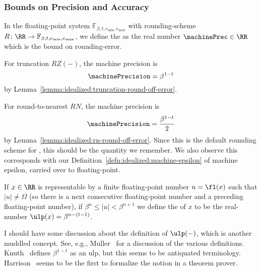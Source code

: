 \subsubsection{Bounds on Precision and Accuracy}

\begin{defn}
  In the floating-point system $\mathbb{F}_{\beta,t,e_{\text{min}},e_{\text{max}}}$
  with rounding-scheme $R\colon\RR\to\mathbb{F}_{\beta,t,e_{\text{min}},e_{\text{max}}}$,
  we define the  as the real number
  $\machinePrec\in\RR$
  which is the bound on rounding-error.
\end{defn}


\begin{ex}
For truncation $RZ(-)$, the machine precision is
\begin{equation}
  \machinePrecision = \beta^{1-t}
\end{equation}
by Lemma~\ref{lemma:idealized:truncation-round-off-error}.
\end{ex}


\begin{ex}
For round-to-nearest $RN$, the machine precision is
\begin{equation}
  \machinePrecision = \frac{\beta^{1-t}}{2}
\end{equation}
by Lemma~\ref{lemma:idealized:rn-round-off-error}. Since this is the
default rounding scheme for , this should be the quantity we
remember. We also observe this corresponds with our
Definition~\ref{defn:idealized:machine-epsilon} of machine epsilon,
carried over to  floating-point.
\end{ex}


\begin{defn}
  If $x\in\RR$ is representable by a finite floating-point number
  $u=\fl(x)$ such that $|u|\neq\Omega$ (so there is a next consecutive
  floating-point number and a preceding floating-point number),
  if $\beta^{n}\leq |u| < \beta^{n+1}$
  we define the  of $x$ to be the real-number
  $\ulp(x) = \beta^{n-(t-1)}$.
\end{defn}

\begin{rmk}
I should have some discussion about the definition of $\ulp(-)$, which
is another muddled concept. See, e.g., Muller~\cite{muller2005ulp} for a
discussion of the various definitions. Knuth~\cite[pp.232--233]{taocp2}
defines $\beta^{1-t}$ as an ulp, but this seems to be antiquated terminology.
Harrison~\cite{harrison-hol99} seems to be the first to formalize the
notion in a theorem prover.
\end{rmk}

